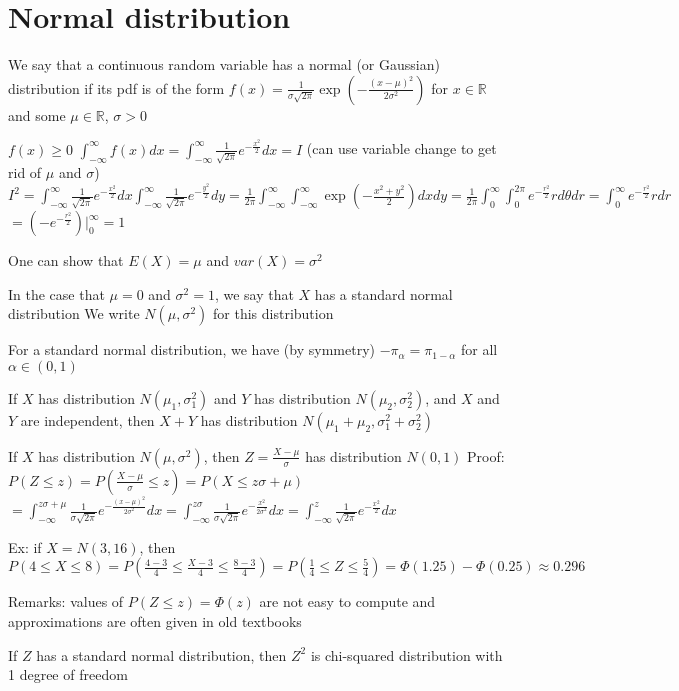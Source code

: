 \documentclass{article}
\begin{document}
\section{Normal distribution}

We say that a continuous random variable has a normal (or Gaussian) distribution if its pdf is of the form $f(x)=\frac{1}{\sigma\sqrt{2\pi}}\exp(-\frac{(x-\mu)^2}{2\sigma^2})$ for $x\in\mathbb{R}$ and some $\mu\in\mathbb{R}$, $\sigma>0$

$f(x)\ge0$
$\int_{-\infty}^\infty f(x)dx=\int_{-\infty}^\infty\frac{1}{\sqrt{2\pi}}e^{-\frac{x^2}{2}}dx=I$ (can use variable change to get rid of $\mu$ and $\sigma$)
$I^2=\int_{-\infty}^\infty\frac{1}{\sqrt{2\pi}}e^{-\frac{x^2}{2}}dx\int_{-\infty}^\infty\frac{1}{\sqrt{2\pi}}e^{-\frac{y^2}{2}}dy=\frac{1}{2\pi}\int_{-\infty}^\infty\int_{-\infty}^\infty\exp(-\frac{x^2+y^2}{2})dxdy=\frac{1}{2\pi}\int_0^\infty\int_0^{2\pi}e^{-\frac{r^2}{2}}rd\theta dr=\int_0^\infty e^{-\frac{r^2}{2}}rdr$
$=(-e^{-\frac{r^2}{2}})\rvert_0^\infty=1$

One can show that $E(X)=\mu$ and $var(X)=\sigma^2$

In the case that $\mu=0$ and $\sigma^2=1$, we say that $X$ has a standard normal distribution
We write $N(\mu,\sigma^2)$ for this distribution

For a standard normal distribution, we have (by symmetry) $-\pi_\alpha=\pi_{1-\alpha}$ for all $\alpha\in(0,1)$

If $X$ has distribution $N(\mu_1,\sigma_1^2)$ and $Y$ has distribution $N(\mu_2,\sigma_2^2)$, and $X$ and $Y$ are independent, then $X+Y$ has distribution $N(\mu_1+\mu_2,\sigma_1^2+\sigma_2^2)$

If $X$ has distribution $N(\mu,\sigma^2)$, then $Z=\frac{X-\mu}{\sigma}$ has distribution $N(0,1)$
Proof: $P(Z\le z)=P(\frac{X-\mu}{\sigma}\le z)=P(X\le z\sigma+\mu)$
$=\int_{-\infty}^{z\sigma+\mu}\frac{1}{\sigma\sqrt{2\pi}}e^{-\frac{(x-\mu)^2}{2\sigma^2}}dx=\int_{-\infty}^{z\sigma}\frac{1}{\sigma\sqrt{2\pi}}e^{-\frac{x^2}{2\sigma^2}}dx=\int_{-\infty}^z\frac{1}{\sqrt{2\pi}}e^{-\frac{x^2}{2}}dx$

Ex: if $X=N(3,16)$, then $P(4\le X\le 8)=P(\frac{4-3}{4}\le\frac{X-3}{4}\le\frac{8-3}{4})=P(\frac{1}{4}\le Z\le\frac{5}{4})=\Phi(1.25)-\Phi(0.25)\approx0.296$

Remarks: values of $P(Z\le z)=\Phi(z)$ are not easy to compute and approximations are often given in old textbooks

If $Z$ has a standard normal distribution, then $Z^2$ is chi-squared distribution with 1 degree of freedom
\end{document}
